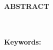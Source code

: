 ~\pagebreak


\begin{center}
	{\fontsize{16}{16}\bfseries ABSTRACT}
\end{center}

\begin{center}
	\vspace{0.5cm}
	{\fontsize{14}{14}\selectfont\MakeUppercase\ThesisTitle}
\end{center}
\OneAndHalfSpacing
~\indent\AbstractText
~\\~\\
\textbf{Keywords: }\AbstractKeywords

\vfill

~\pagebreak
